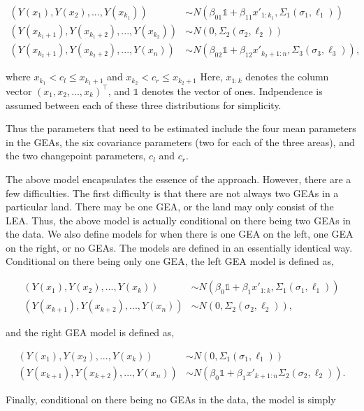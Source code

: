 \documentclass[12pt]{article}
\begin{document}
\begin{align}
(Y(x_1), Y(x_2), ..., Y(x_{k_1})) &\sim N(\beta_{01}\mathbb{1} + \beta_{11} x'_{1:k_1}, \Sigma_1(\sigma_1, \ell_1)) \\
(Y(x_{k_1 + 1}), Y(x_{k_1 + 2}), ..., Y(x_{k_2})) &\sim N(0, \Sigma_2(\sigma_2, \ell_2)) \\ 
(Y(x_{k_2 + 1}), Y(x_{k_2 + 2}), ..., Y(x_n)) &\sim N(\beta_{02}\mathbb{1} + \beta_{12} x'_{k_2 + 1:n}, \Sigma_3(\sigma_3, \ell_3)),
\end{align}

where \(x_{k_1} < c_l \leq x_{k_1 + 1}\) and
\(x_{k_2} < c_r \leq x_{k_2 + 1}\) Here, \(x_{1:k}\) denotes the column
vector \((x_1, x_2, ..., x_k)^\top\), and \(\mathbb{1}\) denotes the
vector of ones. Indpendence is assumed between each of these three
distributions for simplicity.

Thus the parameters that need to be estimated include the four mean
parameters in the GEAs, the six covariance parameters (two for each of
the three areas), and the two changepoint parameters, \(c_l\) and
\(c_r\).

The above model encapsulates the essence of the approach. However, there
are a few difficulties. The first difficulty is that there are not
always two GEAs in a particular land. There may be one GEA, or the land
may only consist of the LEA. Thus, the above model is actually
conditional on there being two GEAs in the data. We also define models
for when there is one GEA on the left, one GEA on the right, or no GEAs.
The models are defined in an essentially identical way. Conditional on
there being only one GEA, the left GEA model is defined as,

\begin{align}
(Y(x_1), Y(x_2), ..., Y(x_{k})) &\sim N(\beta_{0}\mathbb{1} + \beta_{1} x'_{1:k}, \Sigma_1(\sigma_1, \ell_1)) \\
(Y(x_{k + 1}), Y(x_{k + 2}), ..., Y(x_{n})) &\sim N(0, \Sigma_2(\sigma_2, \ell_2)),
\end{align}

and the right GEA model is defined as,

\begin{align}
(Y(x_{1}), Y(x_{2}), ..., Y(x_{k})) &\sim N(0, \Sigma_1(\sigma_1, \ell_1)) \\ 
(Y(x_{k + 1}), Y(x_{k + 2}), ..., Y(x_n)) &\sim N(\beta_{0}\mathbb{1} + \beta_{1} x'_{k + 1:n} \Sigma_2(\sigma_2, \ell_2)).
\end{align}

Finally, conditional on there being no GEAs in the data, the model is
simply
\end{document}
